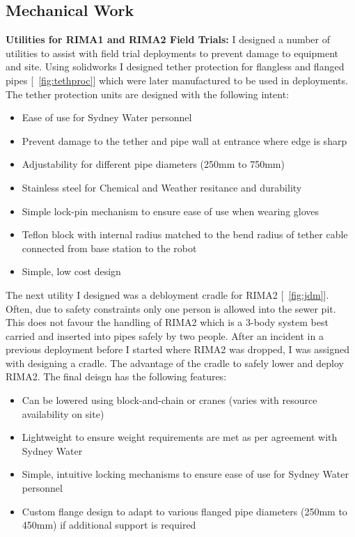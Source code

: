 \newpage
\subsection{Mechanical Work}

\textbf{Utilities for RIMA1 and RIMA2 Field Trials:} I designed a number of utilities to assist with field trial deployments to prevent damage to equipment and site. Using solidworks I designed
tether protection for flangless and flanged pipes [~\ref{fig:tethproc}] which were later manufactured to be used in deployments. The tether protection units are designed with the following intent:

\begin{itemize}
    \item Ease of use for Sydney Water personnel
    \item Prevent damage to the tether and pipe wall at entrance where edge is sharp
    \item Adjustability for different pipe diameters (250mm to 750mm)
    \item Stainless steel for Chemical and Weather resitance and durability
    \item Simple lock-pin mechanism to ensure ease of use when wearing gloves
    \item Teflon block with internal radius matched to the bend radius of tether cable connected from base station to the robot
    \item Simple, low cost design
\end{itemize}


\newpage

The next utility I designed was a debloyment cradle for RIMA2 [~\ref{fig:jdm}]. Often, due to safety constraints only one person is allowed into the sewer pit. This does not favour the handling of RIMA2 which is a 3-body 
system best carried and inserted into pipes safely by two people. After an incident in a previous deployment before I started where RIMA2 was dropped, I was assigned with designing a cradle. The advantage 
of the cradle to safely lower and deploy RIMA2. The final deisgn has the following features:

\begin{itemize}
    \item Can be lowered using block-and-chain or cranes (varies with resource availability on site)
    \item Lightweight to ensure weight requirements are met as per agreement with Sydney Water
    \item Simple, intuitive locking mechanisms to ensure ease of use for Sydney Water personnel
    \item Custom flange design to adapt to various flanged pipe diameters (250mm to 450mm) if additional support is required
\end{itemize}

